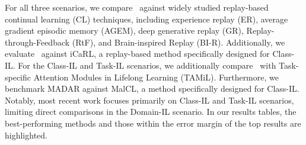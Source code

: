 For all three scenarios, we compare \system\ against widely studied replay-based continual learning (CL) techniques, including experience replay (ER)\cite{er}, average gradient episodic memory (AGEM)\cite{agem}, deep generative replay (GR)\cite{gr}, Replay-through-Feedback (RtF)\cite{rtf}, and Brain-inspired Replay (BI-R)\cite{BIR}. Additionally, we evaluate \system\ against iCaRL\cite{icarl}, a replay-based method specifically designed for Class-IL. For the Class-IL and Task-IL scenarios, we additionally compare \system\ with Task-specific Attention Modules in Lifelong Learning (TAMiL)\cite{tamil}. Furthermore, we benchmark MADAR against MalCL\cite{malcl}, a method specifically designed for Class-IL. Notably, most recent work focuses primarily on Class-IL and Task-IL scenarios, limiting direct comparisons in the Domain-IL scenario. In our results tables, the best-performing methods and those within the error margin of the top results are highlighted. 










